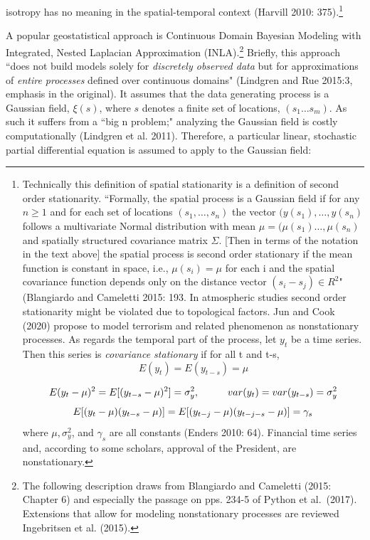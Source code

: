 \documentclass[12pt]{article}
\begin{document}
isotropy has no meaning in the spatial-temporal context (Harvill 2010: 375).\footnote{Technically
this definition of spatial stationarity is a definition of second order stationarity.
``Formally, the spatial process is
a Gaussian field if for any $n \geq 1$ and for each set of locations $(s_1, \ldots, s_n)$ the
vector $(y(s_1), \dots, y(s_n)$ follows a multivariate Normal distribution with mean
$\mu = (\mu(s_1) \ldots, \mu(s_n)$  and spatially structured covariance matrix $\Sigma$.
[Then in terms of the notation in the text above] the spatial process is second order
stationary if the mean function is constant in space, i.e., $\mu(s_i) = \mu$ for each i and
the spatial covariance function depends only on the distance vector $(s_i- s_j) \in R^2$"
(Blangiardo and Cameletti 2015: 193. In atmospheric
studies second order stationarity might be violated due to topological factors. Jun and
Cook (2020) propose to model
terrorism and related phenomenon as nonstationary processes. As regards the temporal
part of the process, let $y_t$ be a time series. Then this series is \textit{covariance
stationary} if for all t and t-s,
\begin{equation}
E(y_t) = E(y_{t-s}) = \mu
\end{equation}

\begin{equation}
E(y_t - \mu)^2 = E[(y_{t-s} - \mu)^2] = \sigma_{y}^2 \\, \hspace{1cm} var(y_t) = var (y_{t-s}) = \sigma_{y}^2
\end{equation}
\begin{equation}
E[(y_t - \mu)(y_{t-s} - \mu)] = E[(y_{t-j} - \mu)(y_{t-j-s} - \mu)] = \gamma_s \\
\end{equation}
where $\mu, \sigma_{y}^2$, and  $\gamma_s$ are all constants (Enders 2010: 64). Financial
time series and, according to some scholars, approval of the President, are
nonstationary.}

A popular geostatistical approach is Continuous
Domain Bayesian Modeling with Integrated, Nested Laplacian Approximation
(INLA).\footnote{The following description draws from Blangiardo and Cameletti (2015: Chapter 6)
and especially the passage on pps. 234-5 of Python et al.\ (2017). Extensions that allow for
modeling nonstationary processes are
reviewed Ingebritsen  et al. (2015). } Briefly, this approach ``does not build models solely
for \emph{discretely observed data} but for approximations of \emph{entire processes} defined
over continuous domains" (Lindgren and Rue 2015:3, emphasis in the original). It assumes that
 the data generating process is a Gaussian field, $\xi(s)$, where $s$ denotes a finite set of
 locations, $(s_1 \ldots s_m)$. As such it suffers from a ``big n problem;" analyzing the
 Gaussian field is costly computationally (Lindgren et al. 2011). Therefore, a particular
 linear, stochastic partial differential equation is assumed to apply to the Gaussian field:
\end{document}
